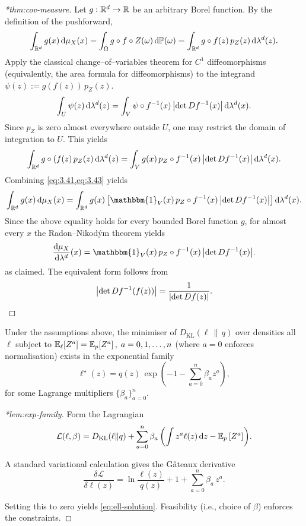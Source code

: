 \begin{proof}[*thm:cov-measure]
    Let \(g: \mathbb{R}^d\to\mathbb{R}\) be an arbitrary Borel function.
    By the definition of the pushforward,
    \begin{equation}
        \int_{\mathbb{R}^d} g(x)\, \dd\mu_X(x) = \int_{\Omega} g\circ f\circ Z (\omega)\,\dd\mathbb{P}(\omega) =
        \int_{\mathbb{R}^d} g\circ f(z)\, p_Z(z)\, \dd\lambda^d(z).
    \end{equation}
    Apply the classical change--of--variables theorem for \(C^1\) diffeomorphisms (equivalently, the area formula for diffeomorphisms) to the integrand \(\psi(z):=g(f(z))\,p_Z(z)\).
    \[
        \int_{U} \psi(z)\, \dd\lambda^d(z) = \int_{V} \psi\circ f^{-1}(x)\, \qty|\det D f^{-1}(x)|\, \dd\lambda^d(x).
    \]
    Since \(p_Z\) is zero almost everywhere outside \(U\), one may restrict the domain of integration to \(U\).
    This yields
    \[
        \int_{\mathbb{R}^d} g\circ(f(z)\, p_Z(z)\, \dd\lambda^d(z) = \int_{V} g(x)\, p_Z\circ f^{-1}(x)\, \qty|\det D f^{-1}(x)|\, \dd\lambda^d(x).
    \]
    Combining \cref{eq:3.41,eq:3.43} yields
    \[
        \int_{\R^d} g(x)\, \dd\mu_X(x) = \int_{\R^d} g(x)\, 
        \qty[ \mathbbm{1}_V(x)\, p_Z\circ f^{-1}(x)\, \qty|\det D f^{-1}(x)| ]\, \dd\lambda^d(x).
    \]
    Since the above equality holds for every bounded Borel function \(g\), for almost every \(x\) the Radon--Nikod\'ym theorem yields
    \[
        \frac{\dd\mu_X}{\dd\lambda^d}(x)=\mathbbm{1}_V(x)\, p_Z\circ f\inv(x)\, \qty|\det D f\inv(x)|.
    \]
as claimed. The equivalent form follows from
\[\qty|\det D f^{-1}(f(z))|=\frac1{\qty|\det D f(z)|}.
\]
\end{proof}


\begin{theorem}
\noproofref
Under the assumptions above, the minimiser of $D_{\mathrm{KL}}(\ell\,\|\,q)$ over densities all $\ell$ subject to
\(
\operatorname{\mathbb{E}}_{\ell}[Z^a]=\operatorname{\mathbb{E}}_{p}[Z^a]\,,\; a=0,1,\dots,n
\)
(where $a=0$ enforces normalisation) exists in the exponential family
\begin{equation}
    \ell^\star(z) = q(z)\,\exp(-1-\sum_{a=0}^n \beta_a z^a),
\end{equation}
for some Lagrange multipliers $\{\beta_a\}_{a=0}^n$.
\end{theorem}

\begin{proof}[*lem:exp-family]
Form the Lagrangian
\begin{equation}
    \mathcal{L}(\ell,\beta) = D_{\mathrm{KL}}(\ell\|q)  + \sum_{a=0}^n \beta_a\,\qty(\int z^a\ell(z)\,\dd z - \operatorname{\mathbb{E}}_{p}\qty[Z^a]).
\end{equation}

A standard variational calculation gives the Gâteaux derivative
\[
\frac{\delta\mathcal{L}}{\delta \ell(z)} = \ln\frac{\ell(z)}{q(z)}+1+\sum_{a=0}^n \beta_a\, z^a.
\]

Setting this to zero yields \cref{eq:ell-solution}. Feasibility (i.e., choice of $\beta$) enforces the constraints.
\end{proof}


